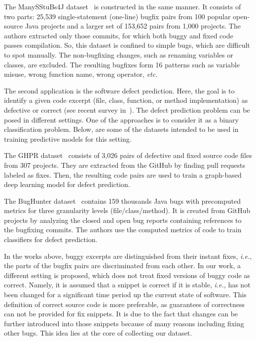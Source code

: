 \documentclass[10pt,conference]{IEEEtran}
\begin{document}
The ManySStuBs4J dataset~\cite{manysstubs4j} is constructed in the same manner. 
It consists of two parts: 25,539 single-statement (one-line) bugfix pairs from 100 popular open-source Java projects and a larger set of 153,652 pairs from 1,000 projects. 
The authors extracted only those commits, for which both buggy and fixed code passes compilation. 
So, this dataset is confined to simple bugs, which are difficult to spot manually. 
The non-bugfixing changes, such as renaming variables or classes, are excluded. 
The resulting bugfixes form 16 patterns such as variable misuse, wrong function name, wrong operator, \textit{etc}. 

The second application is the software defect prediction. 
Here, the goal is to identify a given code excerpt (file, class, function, or method implementation) as defective or correct (see recent survey in~\cite{Akimova2021survey}).
The defect prediction problem can be posed in different settings. One of the approaches is to consider it as a binary classification problem. Below, are some of the datasets intended to be used in training predictive models for this setting.

The GHPR dataset~\cite{XuWangAi2020} consists of 3,026 pairs of defective and fixed source code files from 307 projects. 
They are extracted from the GitHub by finding pull requests labeled as fixes. 
Then, the resulting code pairs are used to train a graph-based deep learning model for defect prediction.

The BugHunter dataset~\cite{FerencEtAl2020} contains 159 thousands Java bugs with precomputed metrics for three granularity levels (file/class/method). 
It is created from GitHub projects by analyzing the closed and open bug reports containing references to the bugfixing commits. 
The authors use the computed metrics of code to train classifiers for defect prediction.

In the works above, buggy excerpts are distinguished from their instant fixes, \textit{i.e.}, the parts of the bugfix pairs are discriminated from each other.
In our work, a different setting is proposed, which does not treat fixed versions of buggy code as correct.
Namely, it is assumed that a snippet is correct if it is stable, \textit{i.e.}, has not been changed for a significant time period up the current state of software.
This definition of correct source code is more preferable, as guarantees of correctness can not be provided for fix snippets. It is due to the fact that changes can be further introduced into those snippets because of many reasons including fixing other bugs. This idea lies at the core of collecting our dataset.
\end{document}

